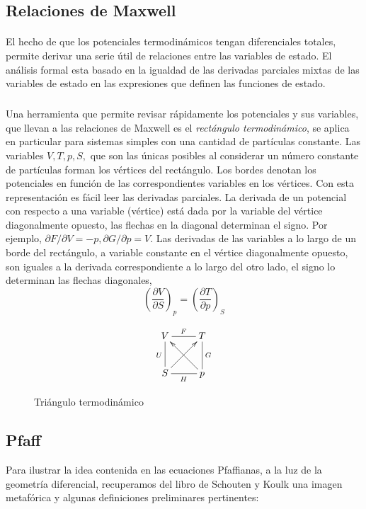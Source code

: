 \documentclass{article}
\theoremstyle{definition} \newtheorem{defi}{Definici\'on}
\theoremstyle{definition} \newtheorem{teo}{Teorema}
\theoremstyle{definition} \newtheorem{cor}{Corolario}
\begin{document}
\subsection{Relaciones de Maxwell}
\paragraph{}
El hecho de que los potenciales termodin\'amicos tengan diferenciales totales, permite derivar una serie \'util de relaciones entre las variables de estado. El an\'alisis formal esta basado en la igualdad de las derivadas parciales mixtas de las variables de estado en las expresiones que definen las funciones de estado.
\subparagraph{}
Una herramienta que permite revisar r\'apidamente los potenciales y sus variables, que llevan a las relaciones de Maxwell es el \emph{rect\'angulo termodin\'amico}, se aplica en particular para sistemas simples con una cantidad de part\'iculas constante. Las variables $V, T, p, S,$ que son las \'unicas posibles al considerar un n\'umero constante de part\'iculas forman los v\'ertices del rect\'angulo. Los bordes denotan los potenciales en funci\'on de las correspondientes variables en los v\'ertices. Con esta representaci\'on es f\'acil leer las derivadas parciales. La derivada de un potencial con respecto a una variable (v\'ertice) est\'a dada por la variable del v\'ertice diagonalmente opuesto, las flechas en la diagonal determinan el signo. Por ejemplo, $\partial F / \partial V = -p, \partial G / \partial p = V.$ Las derivadas de las variables a lo largo de un borde del rect\'angulo, a variable constante en el v\'ertice diagonalmente opuesto, son iguales a la derivada correspondiente a lo largo del otro lado, el signo lo determinan las flechas diagonales, 
$$\left(\frac{\partial V}{\partial S}\right)_p =  \left(\frac{\partial T}{\partial p}\right)_S$$
\begin{figure}[H]
\begin{displaymath}
\centering
\xymatrix
{
V \ar@{-}[r]^F 	\ar@{-}[d]_U &       T  \ar@{-}[d]^G   \\
S \ar[ur]       \ar@{-}[r]_H &       p  \ar[ul]    \\
}
\end{displaymath}
\caption{Tri\'angulo termodin\'amico}
\end{figure}



\subsection{Pfaff}
Para ilustrar la idea contenida en las ecuaciones Pfaffianas, a la luz de la geometr\'ia diferencial, recuperamos del libro de Schouten y Koulk \cite{JS} una imagen metaf\'orica y algunas definiciones preliminares pertinentes:
\end{document}
